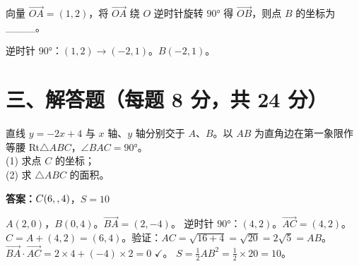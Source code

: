 \documentclass{exam-zh}
\newcommand{\answerarea}[1][40mm]{%
  \vspace{2mm}%
  \begin{tcolorbox}[
    enhanced, breakable,
    colback=white,
    colframe=white,
    boxrule=0pt,
    height=#1,
    valign=top,
    bottom=0mm,
    after skip=0mm,
  ]
  \end{tcolorbox}%
}
\newcounter{solstep}
\begin{document}
\begin{question}[points=4]
  向量 $\overrightarrow{OA} = (1, 2)$，将 $\overrightarrow{OA}$ 绕 $O$ 逆时针旋转 $90°$ 得 $\overrightarrow{OB}$，则点 $B$ 的坐标为\_\_\_\_。
  \fillin
  \paren[$(-2,\\, 1)$]
  \begin{solutionblock}
    逆时针 $90°$：$(1, 2) \to (-2, 1)$。$B(-2, 1)$。
  \end{solutionblock}
\end{question}


\section*{三、解答题（每题 8 分，共 24 分）}


\begin{problem}[points=8]
  直线 $y = -2x + 4$ 与 $x$ 轴、$y$ 轴分别交于 $A$、$B$。以 $AB$ 为直角边在第一象限作等腰 Rt$\triangle ABC$，$\angle BAC = 90°$。\\
(1) 求点 $C$ 的坐标；\\
(2) 求 $\triangle ABC$ 的面积。

  \answerarea[70mm]
  \setcounter{solstep}{0}
  \begin{solutionblock}
    \textbf{答案：}$C(6,\\, 4)$，$S = 10$\par\medskip
    $A(2, 0)$，$B(0, 4)$。$\overrightarrow{BA} = (2, -4)$。
逆时针 $90°$：$(4, 2)$。$\overrightarrow{AC} = (4, 2)$。
$C = A + (4, 2) = (6, 4)$。验证：$AC = \sqrt{16+4} = \sqrt{20} = 2\sqrt{5} = AB$。$\overrightarrow{BA} \cdot \overrightarrow{AC} = 2 \times 4 + (-4) \times 2 = 0$ $\checkmark$。
$S = \frac{1}{2} AB^2 = \frac{1}{2} \times 20 = 10$。

  \end{solutionblock}
\end{problem}


\end{document}
